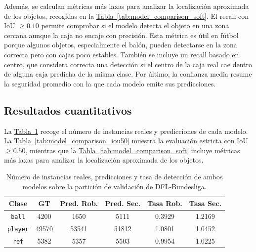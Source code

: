 Además, se calculan métricas más laxas para analizar la localización aproximada de los objetos, recogidas en la \hyperref[tab:model_comparison_soft]{Tabla~\ref*{tab:model_comparison_soft}}. El recall con IoU $\geq 0.10$ permite comprobar si el modelo detecta el objeto en una zona cercana aunque la caja no encaje con precisión. Esta métrica es útil en fútbol porque algunos objetos, especialmente el balón, pueden detectarse en la zona correcta pero con cajas poco estables. También se incluye un recall basado en centro, que considera correcta una detección si el centro de la caja real cae dentro de alguna caja predicha de la misma clase. Por último, la confianza media resume la seguridad promedio con la que cada modelo emite sus predicciones.


\subsection{Resultados cuantitativos}

La \hyperref[tab:model_comparison_counts]{Tabla~\ref*{tab:model_comparison_counts}} recoge el número de instancias reales y predicciones de cada modelo. La \hyperref[tab:model_comparison_iou50]{Tabla~\ref*{tab:model_comparison_iou50}} muestra la evaluación estricta con IoU $\geq 0.50$, mientras que la \hyperref[tab:model_comparison_soft]{Tabla~\ref*{tab:model_comparison_soft}} incluye métricas más laxas para analizar la localización aproximada de los objetos.

\begin{table}[H]
\centering
\scriptsize
\begin{tabular}{c|c|c|c|c|c}
\textbf{Clase} & \textbf{GT} & \textbf{Pred. Rob.} & \textbf{Pred. Sec.} & \textbf{Tasa Rob.} & \textbf{Tasa Sec.} \\
\hline\hline
\texttt{ball} & 4200 & 1650 & 5111 & 0.3929 & 1.2169 \\
\hline
\texttt{player} & 49570 & 53541 & 51812 & 1.0801 & 1.0452 \\
\hline
\texttt{ref} & 5382 & 5357 & 5503 & 0.9954 & 1.0225 \\
\hline
\end{tabular}
\caption[Instancias y predicciones en la validación de DFL-Bundesliga]{
Número de instancias reales, predicciones y tasa de detección de ambos modelos sobre la partición de validación de DFL-Bundesliga.
}
\label{tab:model_comparison_counts}
\end{table}

